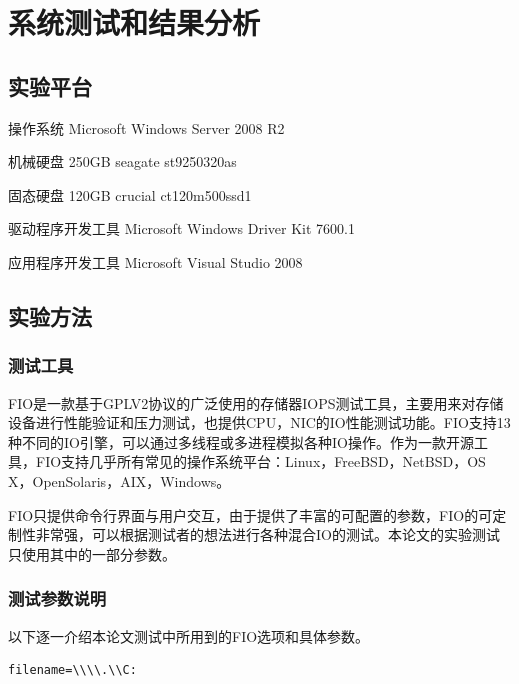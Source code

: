 
\chapter{系统测试和结果分析}
\label{cha:exp_analysis}

\section{实验平台}
\label{sec:exp_platform}

操作系统 Microsoft Windows Server 2008 R2

机械硬盘 250GB seagate st9250320as

固态硬盘 120GB crucial ct120m500ssd1

驱动程序开发工具 Microsoft Windows Driver Kit 7600.1

应用程序开发工具 Microsoft Visual Studio 2008

\section{实验方法}
\label{sec:exp_method}

\subsection{测试工具}
FIO是一款基于GPLV2协议的广泛使用的存储器IOPS测试工具，主要用来对存储设备进行性能验证和压力测试，也提供CPU，NIC的IO性能测试功能。FIO支持13种不同的IO引擎，可以通过多线程或多进程模拟各种IO操作。作为一款开源工具，FIO支持几乎所有常见的操作系统平台：Linux，FreeBSD，NetBSD，OS X，OpenSolaris，AIX，Windows。

FIO只提供命令行界面与用户交互，由于提供了丰富的可配置的参数，FIO的可定制性非常强，可以根据测试者的想法进行各种混合IO的测试。本论文的实验测试只使用其中的一部分参数。

\subsection{测试参数说明}

以下逐一介绍本论文测试中所用到的FIO选项和具体参数。

\begin{lstlisting}
filename=\\\\.\\C:
\end{lstlisting}

